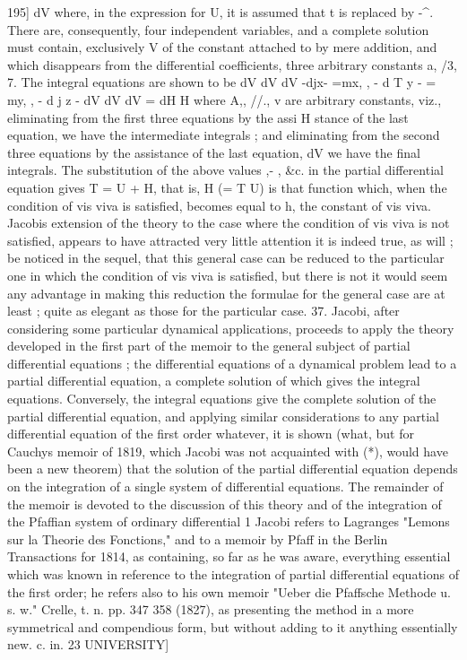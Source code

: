 \documentclass[11pt,a4paper]{book}
\begin{document}
195]
dV
where, in the expression for U, it is assumed that t is replaced by -^. There are,
consequently, four independent variables, and a complete solution must contain, exclusively
V
of the constant attached to by mere addition, and which disappears from the
differential coefficients, three arbitrary constants a, /3, 7. The integral equations are
shown to be
dV dV dV
-djx- =mx,
,
-
d
T
y
- = my,
,
-
d
j
z
-
dV dV dV
=
dH
H
where A,, //., v are arbitrary constants, viz., eliminating from the first three equations
by the assi H stance of the last equation, we have the intermediate integrals ; and
eliminating from the second three equations by the assistance of the last equation,
dV
we have the final integrals. The substitution of the above values ,- , &c. in the
partial differential equation gives T = U + H, that is, H (= T U) is that function
which, when the condition of vis viva is satisfied, becomes equal to h, the constant of
vis viva.
Jacobis extension of the theory to the case where the condition of vis viva is
not satisfied, appears to have attracted very little attention it is indeed true, as will
;
be noticed in the sequel, that this general case can be reduced to the particular one
in which the condition of vis viva is satisfied, but there is not it would seem any
advantage in making this reduction the formulae for the general case are at least
;
quite as elegant as those for the particular case.
37. Jacobi, after considering some particular dynamical applications, proceeds to
apply the theory developed in the first part of the memoir to the general subject of
partial differential equations ; the differential equations of a dynamical problem lead to
a partial differential equation, a complete solution of which gives the integral equations.
Conversely, the integral equations give the complete solution of the partial differential
equation, and applying similar considerations to any partial differential equation of the
first order whatever, it is shown (what, but for Cauchys memoir of 1819, which
Jacobi was not acquainted with (*), would have been a new theorem) that the solution
of the partial differential equation depends on the integration of a single system
of differential equations. The remainder of the memoir is devoted to the discussion
of this theory and of the integration of the Pfaffian system of ordinary differential
1 Jacobi refers to Lagranges "Lemons sur la Theorie des Fonctions," and to a memoir by Pfaff in the
Berlin Transactions for 1814, as containing, so far as he was aware, everything essential which was
known in reference to the integration of partial differential equations of the first order; he refers also to
his own memoir "Ueber die Pfaffsche Methode u. s. w." Crelle, t. n. pp. 347 358 (1827), as presenting the
method in a more symmetrical and compendious form, but without adding to it anything essentially new.
c. in. 23
UNIVERSITY]
\end{document}
